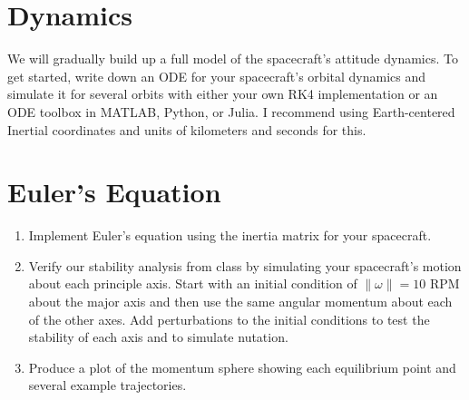 \documentclass[11pt,letterpaper]{article}
\begin{document}
\section{Dynamics}

We will gradually build up a full model of the spacecraft's attitude dynamics. To get started, write down an ODE for your spacecraft's orbital dynamics and simulate it for several orbits with either your own RK4 implementation or an ODE toolbox in MATLAB, Python, or Julia. I recommend using Earth-centered Inertial coordinates and units of kilometers and seconds for this.

\section{Euler's Equation}

\begin{enumerate}
	\item Implement Euler's equation using the inertia matrix for your spacecraft.
	\item Verify our stability analysis from class by simulating your spacecraft's motion about each principle axis. Start with an initial condition of $\| \omega \| = 10$ RPM about the major axis and then use the same angular momentum about each of the other axes. Add perturbations to the initial conditions to test the stability of each axis and to simulate nutation.
	\item Produce a plot of the momentum sphere showing each equilibrium point and several example trajectories.
	\end{enumerate}
\end{document}
